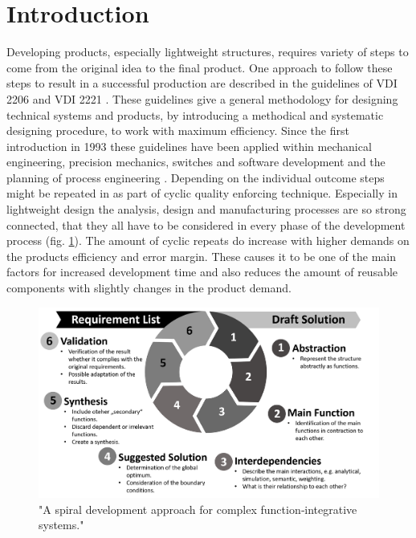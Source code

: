 \section{\label{sec:SoA}Introduction}
Developing products, especially lightweight structures, 
requires variety of steps to come from the original idea to the final product.
One approach to follow these steps to result in a successful production 
are described in the guidelines of VDI 2206 \cite{gausmeier2002} and VDI 2221 \cite{Jansch2006THEDO}.
These guidelines give a general methodology for designing technical systems and products, 
by introducing a methodical and systematic designing procedure, to work with maximum efficiency.
Since the first introduction in 1993 these guidelines have been applied within mechanical engineering, precision mechanics, 
switches and software development and the planning of process engineering \cite{pahl_beitz_2013}. 
Depending on the individual outcome steps might be repeated in as part of cyclic quality enforcing technique.
Especially in lightweight design the analysis, design and manufacturing processes are so strong connected, 
that they all have to be considered in every phase of the development process (fig. \ref{pic:interactive-design}).
The amount of cyclic repeats do increase with higher demands on the products efficiency and error margin.
These causes it to be one of the main factors for increased development time and 
also reduces the amount of reusable components with slightly changes in the product demand.\\
\begin{figure}[h]
    \centering
    \includegraphics[scale=0.4]{pics/cyclic-design.PNG}
    \caption{\label{pic:interactive-design} "A spiral development approach for complex function‐integrative systems." \cite{Modler2020}}
\end{figure}\\
